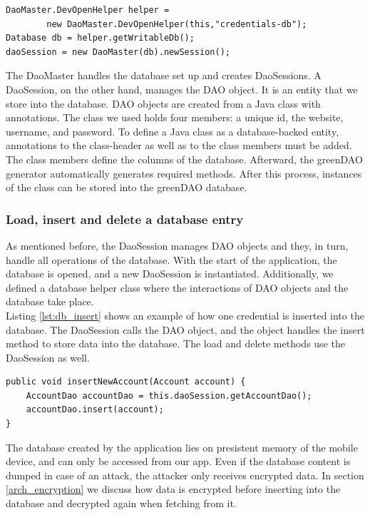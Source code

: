\begin{lstlisting}[caption=Creation of database, label=lst:db_master]
DaoMaster.DevOpenHelper helper = 
        new DaoMaster.DevOpenHelper(this,"credentials-db");
Database db = helper.getWritableDb();
daoSession = new DaoMaster(db).newSession();
\end{lstlisting}
\vspace{0.5cm}

The DaoMaster handles the database set up and creates DaoSessions. A DaoSession, on the other hand, manages the DAO object. It is an entity that we store into the database. DAO objects are created from a Java class with annotations. The class we used holds four members: a unique id, the website, username, and password. To define a Java class as a database-backed entity, annotations to the class-header as well as to the class members must be added. The class members define the columns of the database. Afterward, the greenDAO generator automatically generates required methods. After this process, instances of the class can be stored into the greenDAO database. \cite{Greendao} \\

\subsubsection*{Load, insert and delete a database entry}
As mentioned before, the DaoSession manages DAO objects and they, in turn, handle all operations of the database. With the start of the application, the database is opened, and a new DaoSession is instantiated.
Additionally, we defined a database helper class where the interactions of DAO objects and the database take place. \\
Listing \ref{lst:db_insert} shows an example of how one credential is inserted into the database. The DaoSession calls the DAO object, and the object handles the insert method to store data into the database. The load and delete methods use the DaoSession as well. \\


\begin{lstlisting}[caption= Insert entry into database, label=lst:db_insert]
public void insertNewAccount(Account account) {
    AccountDao accountDao = this.daoSession.getAccountDao();
    accountDao.insert(account);
}
\end{lstlisting}
\vspace{0.5cm}


The database created by the application lies on presistent memory of the mobile device, and can only be accessed from our app. Even if the database content is dumped in case of an attack, the attacker only receives encrypted data. In section \ref{arch_encryption} we discuss how data is encrypted before inserting into the database and decrypted again when fetching from it.

